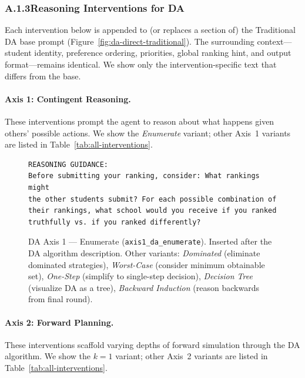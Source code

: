 \subsubsection*{A.1.3\quad Reasoning Interventions for DA}

Each intervention below is appended to (or replaces a section of) the Traditional DA base prompt (Figure~\ref{fig:da-direct-traditional}). The surrounding context---student identity, preference ordering, priorities, global ranking hint, and output format---remains identical. We show only the intervention-specific text that differs from the base.

\paragraph{Axis 1: Contingent Reasoning.}
These interventions prompt the agent to reason about what happens given others' possible actions. We show the \emph{Enumerate} variant; other Axis~1 variants are listed in Table~\ref{tab:all-interventions}.

\begin{figure}[H]
\begin{lstlisting}
REASONING GUIDANCE:
Before submitting your ranking, consider: What rankings might
the other students submit? For each possible combination of
their rankings, what school would you receive if you ranked
truthfully vs. if you ranked differently?
\end{lstlisting}
\caption{DA Axis 1 --- Enumerate (\texttt{axis1\_da\_enumerate}). Inserted after the DA algorithm description. Other variants: \emph{Dominated} (eliminate dominated strategies), \emph{Worst-Case} (consider minimum obtainable set), \emph{One-Step} (simplify to single-step decision), \emph{Decision Tree} (visualize DA as a tree), \emph{Backward Induction} (reason backwards from final round).}
\label{fig:da-axis1-enumerate}
\end{figure}

\paragraph{Axis 2: Forward Planning.}
These interventions scaffold varying depths of forward simulation through the DA algorithm. We show the $k{=}1$ variant; other Axis~2 variants are listed in Table~\ref{tab:all-interventions}.


